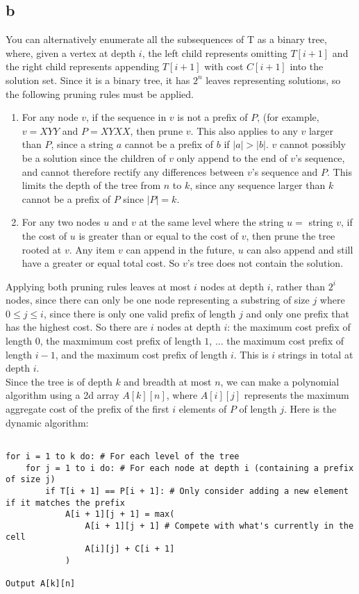 \documentclass[letterpaper,notitlepage,twoside]{article}
\begin{document}
\subsection*{b}
You can alternatively enumerate all the subsequences of T as a binary tree, where, given a vertex at depth $i$, the left child represents omitting $T[i + 1]$ and the right child represents appending $T[i + 1]$ with cost $C[i + 1]$ into the solution set. Since it is a binary tree, it has $2^n$ leaves representing solutions, so the following pruning rules must be applied.
\begin{enumerate}
\item For any node $v$, if the sequence in $v$ is not a prefix of $P$, (for example, $v = XYY$ and $P = XYXX$, then prune $v$. This also applies to any $v$ larger than $P$, since a string $a$ cannot be a prefix of $b$ if $|a| > |b|$. $v$ cannot possibly be a solution since the children of $v$ only append to the end of $v$'s sequence, and cannot therefore rectify any differences between $v$'s sequence and $P$. This limits the depth of the tree from $n$ to $k$, since any sequence larger than $k$ cannot be a prefix of $P$ since $|P| = k$.
\item For any two nodes $u$ and $v$ at the same level where the string $u = $ string $v$, if the cost of $u$ is greater than or equal to the cost of $v$, then prune the tree rooted at $v$. Any item $v$ can append in the future, $u$ can also append and still have a greater or equal total cost. So $v$'s tree does not contain the solution.
\end{enumerate}
Applying both pruning rules leaves at most $i$ nodes at depth $i$, rather than $2^i$ nodes, since there can only be one node representing a substring of size $j$ where $0 \leq j \leq i$, since there is only one valid prefix of length $j$ and only one prefix that has the highest cost. So there are $i$ nodes at depth $i$: the maximum cost prefix of length $0$, the maxmimum cost prefix of length $1$, ... the maximum cost prefix of length $i - 1$, and the maximum cost prefix of length $i$. This is $i$ strings in total at depth $i$. \\

Since the tree is of depth $k$ and breadth at most $n$, we can make a polynomial algorithm using a 2d array $A[k][n]$, where $A[i][j]$ represents the maximum aggregate cost of the prefix of the first $i$ elements of $P$ of length $j$. Here is the dynamic algorithm:
\begin{verbatim}

for i = 1 to k do: # For each level of the tree
    for j = 1 to i do: # For each node at depth i (containing a prefix of size j)
        if T[i + 1] == P[i + 1]: # Only consider adding a new element if it matches the prefix
            A[i + 1][j + 1] = max(
                A[i + 1][j + 1] # Compete with what's currently in the cell
                A[i][j] + C[i + 1]
            )

Output A[k][n]
\end{verbatim}
\end{document}
